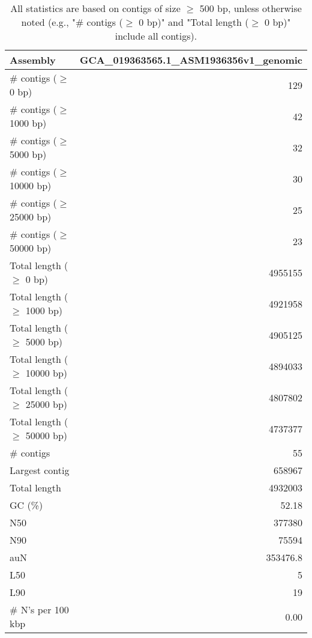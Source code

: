 \documentclass[12pt,a4paper]{article}
\begin{document}
\begin{table}[ht]
\begin{center}
\caption{All statistics are based on contigs of size $\geq$ 500 bp, unless otherwise noted (e.g., "\# contigs ($\geq$ 0 bp)" and "Total length ($\geq$ 0 bp)" include all contigs).}
\begin{tabular}{|l*{1}{|r}|}
\hline
Assembly & GCA\_019363565.1\_ASM1936356v1\_genomic \\ \hline
\# contigs ($\geq$ 0 bp) & 129 \\ \hline
\# contigs ($\geq$ 1000 bp) & 42 \\ \hline
\# contigs ($\geq$ 5000 bp) & 32 \\ \hline
\# contigs ($\geq$ 10000 bp) & 30 \\ \hline
\# contigs ($\geq$ 25000 bp) & 25 \\ \hline
\# contigs ($\geq$ 50000 bp) & 23 \\ \hline
Total length ($\geq$ 0 bp) & 4955155 \\ \hline
Total length ($\geq$ 1000 bp) & 4921958 \\ \hline
Total length ($\geq$ 5000 bp) & 4905125 \\ \hline
Total length ($\geq$ 10000 bp) & 4894033 \\ \hline
Total length ($\geq$ 25000 bp) & 4807802 \\ \hline
Total length ($\geq$ 50000 bp) & 4737377 \\ \hline
\# contigs & 55 \\ \hline
Largest contig & 658967 \\ \hline
Total length & 4932003 \\ \hline
GC (\%) & 52.18 \\ \hline
N50 & 377380 \\ \hline
N90 & 75594 \\ \hline
auN & 353476.8 \\ \hline
L50 & 5 \\ \hline
L90 & 19 \\ \hline
\# N's per 100 kbp & 0.00 \\ \hline
\end{tabular}
\end{center}
\end{table}
\end{document}
